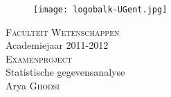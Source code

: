%
\begin{titlepage}
\enlargethispage{10cm}
\begin{flushleft}
\begin{figure}[h]
\texttt{[image: logobalk-UGent.jpg]}
\end{figure}
\end{flushleft}
\begin{center}
\textsc{Faculteit Wetenschappen}
\\[2cm]
\small{Academiejaar 2011-2012}
\\[3cm]
\LARGE{\textsc{Examenproject}}\\[1cm]
\large{Statistische gegevensanalyse}
\\[11.5cm]
\small{Arya \textsc{Ghodsi}}\\
\end{center}
\end{titlepage}

%
